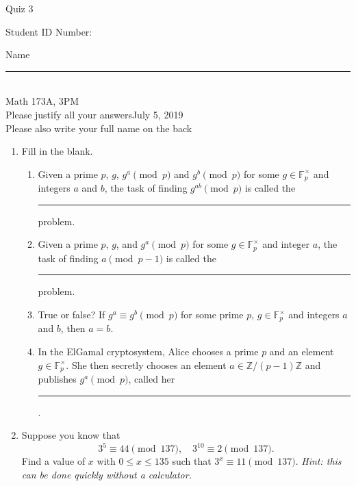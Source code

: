 \documentclass[12pt]{article}
\newcommand{\integers}{\mathbb{Z}}
\begin{document}
\begin{flushleft} 
\centerline{\LARGE{Quiz 3}} 
\vspace{5 mm}
{Student ID Number:}\hfill  
{Name \rule {2 in}{0.01in}}\\
Math 173A, 3PM
\\
{Please justify all your answers}\hfill {July 5, 2019}
\\
{Please also write your full name on the back} 

\medskip
\end{flushleft}

\begin{enumerate}
	\item Fill in the blank.
	\begin{enumerate}
		\item Given a prime $p$, $g$, $g^a \pmod{p}$ and $g^b\pmod{p}$ for some $g\in \mathbb{F}_p^\times$ and integers $a$ and $b$, the task of finding $g^{ab}\pmod{p}$ is called the \rule{3.5cm}{.15mm} problem.

		\item Given a prime $p$, $g$, and $g^a \pmod{p}$ for some $g\in \mathbb{F}_p^\times$ and integer $a$, the task of finding $a \pmod{p-1}$ is called the \rule{3.5cm}{.15mm} problem.

		\item True or false? If $g^a \equiv g^b \pmod{p}$ for some prime $p$, $g\in \mathbb{F}_p^\times$ and integers $a$ and $b$, then $a = b$.

		\item In the ElGamal cryptosystem, Alice chooses a prime $p$ and an element $g\in \mathbb{F}_p^\times$. She then secretly chooses an element $a\in \integers/(p-1)\integers$ and publishes $g^a \pmod{p}$, called her \rule{3.5cm}{.15mm}.
	\end{enumerate}

	\item Suppose you know that
	\[
	3^5 \equiv 44 \pmod{137},\quad 3^{10}\equiv 2 \pmod{137}.
	\]
	Find a value of $x$ with $0\leq x \leq 135$ such that $3^x \equiv 11\pmod{137}$. \textit{Hint: this can be done quickly without a calculator.}
	\vfill
\end{enumerate}

\end{document}
